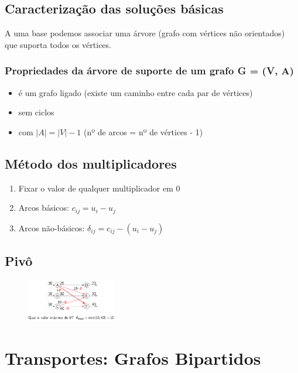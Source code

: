 \documentclass[10pt, a4paper]{article}
\begin{document}
\begin{multicols}{2}
\subsection{Caracterização das soluções básicas}

A uma base podemos associar uma árvore (grafo com vértices não orientados) que suporta todos os vértices.

\subsubsection{Propriedades da árvore de suporte de um grafo G = (V, A)}

\begin{itemize}
    \item é um grafo ligado (existe um caminho entre cada par de vértices)
    \item sem ciclos
    \item com \(|A| = |V| - 1\) (nº de arcos = nº de vértices - 1)
\end{itemize}

\subsection{Método dos multiplicadores}

\begin{enumerate}
    \item Fixar o valor de qualquer multiplicador em 0
    \item Arcos básicos: \(c_{ij} = u_i - u_j\)
    \item Arcos não-básicos: $\delta_{ij} = c_{ij} - (u_i - u_j)$
\end{enumerate}

\subsection{Pivô}

\begin{figure}[H]
    \centering
    \includegraphics[width=0.35\textwidth]{pivo_intr.png}
\end{figure}



\section{Transportes: Grafos Bipartidos}


\end{multicols}
\end{document}
